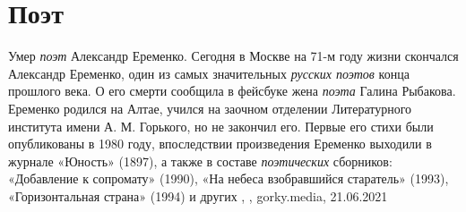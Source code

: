  
 
 
 
 
\chapter{Поэт}

Умер \emph{поэт} Александр Еременко.  Сегодня в Москве на 71-м году жизни
скончался Александр Еременко, один из самых значительных \emph{русских поэтов}
конца прошлого века. О его смерти сообщила в фейсбуке жена \emph{поэта} Галина
Рыбакова.  Еременко родился на Алтае, учился на заочном отделении Литературного
института имени А.  М. Горького, но не закончил его. Первые его стихи были
опубликованы в 1980 году, впоследствии произведения Еременко выходили в журнале
«Юность» (1897), а также в составе \emph{поэтических} сборников: «Добавление к
сопромату» (1990), «На небеса взобравшийся старатель» (1993), «Горизонтальная
страна» (1994) и других
, 
, gorky.media, 21.06.2021

